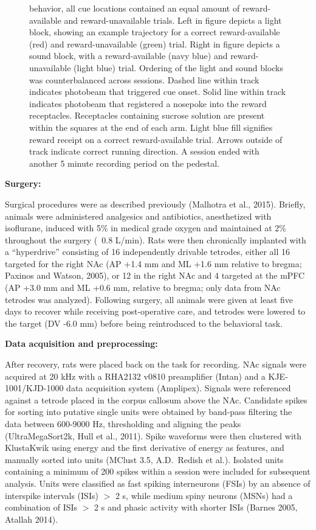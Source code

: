 \documentclass[11pt]{article}
\begin{document}
\begin{figure}[h]
{  behavior, all cue locations contained an equal amount of reward-available and
  reward-unavailable trials. Left in figure depicts a light block, showing an
  example trajectory for a correct reward-available (red) and reward-unavailable
  (green) trial. Right in figure depicts a sound block, with a reward-available
  (navy blue) and reward-unavailable (light blue) trial. Ordering of the light
  and sound blocks was counterbalanced across sessions. Dashed line within track
  indicates photobeam that triggered cue onset. Solid line within track
  indicates photobeam that registered a nosepoke into the reward
  receptacles. Receptacles containing sucrose solution are present within the
  squares at the end of each arm. Light blue fill signifies reward receipt on a
  correct reward-available trial. Arrows outside of track indicate correct
  running direction. A session ended with another 5 minute recording period on
  the pedestal.}
\label{fig:task}
\end{figure}

{\bf Surgery:} 

Surgical procedures were as described previously (Malhotra et al.,
2015). Briefly, animals were administered analgesics and antibiotics,
anesthetized with isoflurane, induced with 5\% in medical grade oxygen and
maintained at 2\% throughout the surgery (~0.8 L/min). Rats were then
chronically implanted with a ``hyperdrive'' consisting of 16 independently
drivable tetrodes, either all 16 targeted for the right NAc (AP +1.4 mm and ML
+1.6 mm relative to bregma; Paxinos and Watson, 2005), or 12 in the right NAc
and 4 targeted at the mPFC (AP +3.0 mm and ML +0.6 mm, relative to bregma; only
data from NAc tetrodes was analyzed). Following surgery, all animals were given
at least five days to recover while receiving post-operative care, and tetrodes
were lowered to the target (DV -6.0 mm) before being reintroduced to the
behavioral task.

{\bf Data acquisition and preprocessing:}

After recovery, rats were placed back on the task for recording. NAc signals
were acquired at 20 kHz with a RHA2132 v0810 preamplifier (Intan) and a
KJE-1001/KJD-1000 data acquisition system (Amplipex). Signals were referenced
against a tetrode placed in the corpus callosum above the NAc. Candidate spikes
for sorting into putative single units were obtained by band-pass filtering the
data between 600-9000 Hz, thresholding and aligning the peaks (UltraMegaSort2k,
Hull et al., 2011). Spike waveforms were then clustered with KlustaKwik using
energy and the first derivative of energy as features, and manually sorted into
units (MClust 3.5, A.D.\ Redish et al.). Isolated units containing a minimum of
200 spikes within a session were included for subsequent analysis. Units were
classified as fast spiking interneurons (FSIs) by an absence of interspike
intervals (ISIs) $>$ 2 s, while medium spiny neurons (MSNs) had a combination of
ISIs $>$ 2 s and phasic activity with shorter ISIs (Barnes 2005, Atallah 2014).
\end{document}
